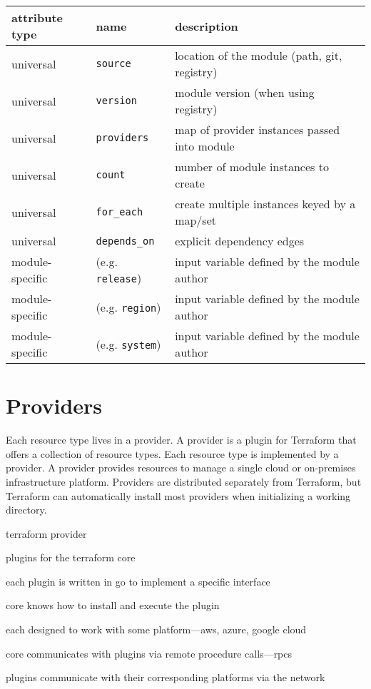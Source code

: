 \documentclass[openany, 12pt]{book}
\begin{document}
\begin{center}
	\begin{tabular}{lll}
		\toprule
		attribute type  & name                    & description                                  \\
		\midrule
		universal       & \texttt{source}         & location of the module (path, git, registry) \\
		universal       & \texttt{version}        & module version (when using registry)         \\
		universal       & \texttt{providers}      & map of provider instances passed into module \\
		universal       & \texttt{count}          & number of module instances to create         \\
		universal       & \texttt{for\_each}      & create multiple instances keyed by a map/set \\
		universal       & \texttt{depends\_on}    & explicit dependency edges                    \\
		\midrule
		module-specific & (e.g. \texttt{release}) & input variable defined by the module author  \\
		module-specific & (e.g. \texttt{region})  & input variable defined by the module author  \\
		module-specific & (e.g. \texttt{system})  & input variable defined by the module author  \\
		\bottomrule
	\end{tabular}
\end{center}

\chapter{Providers}
Each resource type lives in a provider. A provider is a plugin for Terraform
that offers a collection of resource types. Each resource type is implemented by
a provider. A provider provides resources to manage a single cloud or
on-premises infrastructure platform. Providers are distributed separately from
Terraform, but Terraform can automatically install most providers when
initializing a working directory.

\begin{definition}{terraform provider}{}
	\begin{alist}
		\item plugins for the terraform core
		\item each plugin is written in go to implement a specific interface
		\item core knows how to install and execute the plugin
		\item each designed to work with some platform---aws, azure, google cloud
		\item core communicates with plugins via remote procedure calls---rpcs
		\item plugins communicate with their corresponding platforms via the network
	\end{alist}
\end{definition}
\end{document}
